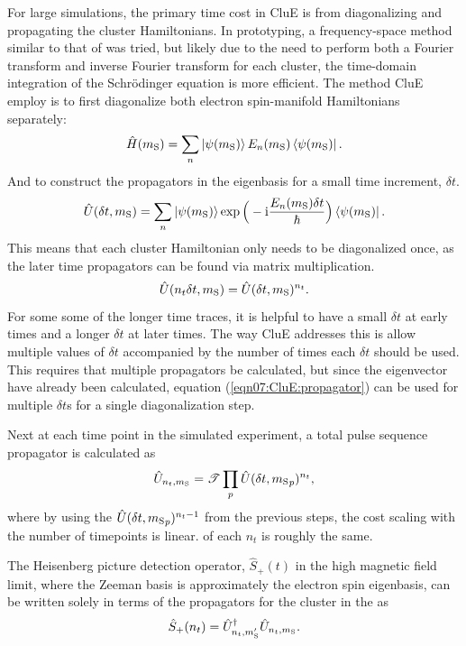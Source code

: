 \documentclass{book}
\begin{document}
For large simulations, the primary time cost in CluE is from 
diagonalizing and propagating the cluster Hamiltonians.  
In prototyping, a frequency-space method similar to that of \cite{2009_Stoll}
was tried, but likely due to the need to perform both 
a Fourier transform and inverse Fourier transform for each cluster, 
the time-domain integration of the Schr{\"o}dinger equation is more efficient.
The method CluE employ is to first diagonalize both
electron spin-manifold Hamiltonians separately:
%
\begin{equation}
\hat{H}(m_{\mathrm{S}}) 
= 
\sum_{n } 
\ket{\psi(m_{\mathrm{S}})}
E_n(m_{\mathrm{S}})
\bra{\psi(m_{\mathrm{S}})}
.
\end{equation}
% 
And to construct the propagators in the eigenbasis for a small time increment,
$\delta t$.
%
\begin{equation} \label{eqn07:CluE:propagator}
\hat{U}(\delta t, m_{\mathrm{S}}) 
= 
\sum_{n } 
\ket{\psi(m_{\mathrm{S}})}
\exp \Big(-\mathrm{i} \frac{E_n(m_{\mathrm{S}})  \delta t }{\hbar} \Big)
\bra{\psi(m_{\mathrm{S}})}
.
\end{equation}
% 
This means that each cluster Hamiltonian only needs to be diagonalized once, 
as the later time propagators can be found via matrix multiplication. 
%
\begin{equation}
\hat{U}(n_t \delta t, m_{\mathrm{S}}) = 
\hat{U}(\delta t, m_{\mathrm{S}})^{n_t}. 
\end{equation}
%
For some some of the longer time traces, it is helpful to have a small 
$\delta t$ at early times and a longer $\delta t$ at later times.  
The way CluE addresses this is allow multiple values of $\delta t$ 
accompanied by the number of times each $\delta t$ should be used.  
This requires that multiple propagators be calculated, 
but since the eigenvector have already been
calculated, equation (\ref{eqn07:CluE:propagator}) can be used for multiple
$\delta t$s for a single diagonalization step.

Next at each time point in the simulated experiment, a total  pulse sequence
propagator is calculated as
%
\begin{equation}
\hat{U}_{n_t,m_{\mathrm{S}}} = 
\mathscr{T} \prod_{p} \hat{U}(\delta t, {m_{\mathrm{S}}}_p)^{n_t}
,
\end{equation}
%
where by using the $\hat{U}(\delta t, {m_{\mathrm{S}}}_p)^{n_t-1}$ from the
previous steps, the cost scaling with the number of timepoints is linear. 
of each $n_t$ is roughly the same. 

The Heisenberg picture detection operator, $\hat{S}_{+}(t)$ in the high 
magnetic field limit, where the Zeeman basis is approximately the electron
spin eigenbasis, can be written solely in terms of the propagators for the
cluster in the as
%
\begin{equation}
\hat{S}_+(n_t) = 
\hat{U}_{n_t,m_{\mathrm{S}}'}^{\dagger} \hat{U}_{n_t,m_{\mathrm{S}}}  
.
\end{equation}
%
\end{document}
